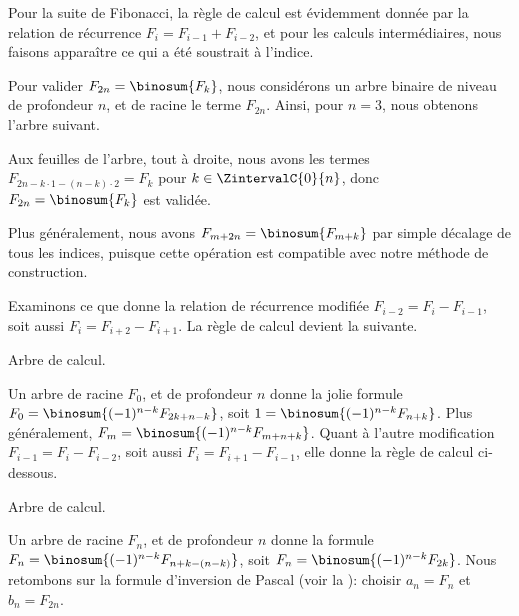 Pour la suite de Fibonacci, la règle de calcul est évidemment donnée par la relation de récurrence $F_{i} = F_{i-1} + F_{i-2}$, et pour les calculs intermédiaires, nous faisons apparaître ce qui a été soustrait à l'indice.

%
            {\intertree}{}

Pour valider $F_{2n} = \binosum{F_k}$, nous considérons un arbre binaire de niveau de profondeur $n$, et de racine le terme $F_{2n}$.
Ainsi, pour $n=3$, nous obtenons l'arbre suivant.


Aux feuilles de l'arbre, tout à droite, nous avons les termes 
$F_{2n - k\cdot1 - (n-k)\cdot2} = F_k$
pour $k \in \ZintervalC{0}{n}$,
donc
$F_{2n} = \binosum{F_k}$ est validée.


\begin{remark}
	Plus généralement, nous avons
	$F_{m+2n} = \binosum{F_{m+k}}$
	par simple décalage de tous les indices,
	puisque cette opération est compatible avec notre méthode de construction.
\end{remark}




\begin{remark}
	Examinons ce que donne la relation de récurrence modifiée $F_{i-2} = F_{i} - F_{i-1}$, soit aussi $F_i = F_{i+2} - F_{i+1}$.
	La règle de calcul devient la suivante.

    \begin{center}
    	\itshape\centering
        
    
        Arbre de calcul.
    \end{center}
    
    Un arbre de racine $F_0$, et de profondeur $n$ donne la jolie formule
    $F_{0} = \binosum{(-1)^{n-k} F_{2k + n - k}}$,
    soit
    $1 = \binosum{(-1)^{n-k} F_{n + k}}$.
    Plus généralement,
    $F_{m} = \binosum{(-1)^{n-k} F_{m + n + k}}$.
    Quant à l'autre modification $F_{i-1} = F_{i} - F_{i-2}$, soit aussi $F_i = F_{i+1} - F_{i-1}$, elle donne la règle de calcul ci-dessous.

    \begin{center}
    	\itshape\centering
        
    
        Arbre de calcul.
    \end{center}
    
    Un arbre de racine $F_n$, et de profondeur $n$ donne la formule
    $F_{n} = \binosum{(-1)^{n-k} F_{n + k - (n - k)}}$,
    soit
    $F_{n} = \binosum{(-1)^{n-k} F_{2 k}}$.
    Nous retombons sur la formule d'inversion de Pascal (voir la ):
    choisir $a_n = F_n$ et $b_n = F_{2n}$. 
\end{remark}


